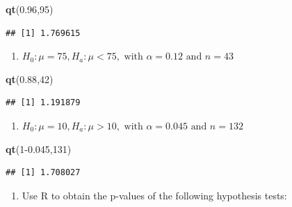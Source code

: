 \documentclass[
  openany]{book}
\newenvironment{Shaded}{\begin{snugshade}}{\end{snugshade}}
\newcommand{\DecValTok}[1]{\textcolor[rgb]{0.00,0.00,0.81}{#1}}
\newcommand{\FloatTok}[1]{\textcolor[rgb]{0.00,0.00,0.81}{#1}}
\newcommand{\FunctionTok}[1]{\textcolor[rgb]{0.13,0.29,0.53}{\textbf{#1}}}
\newcommand{\NormalTok}[1]{#1}
\providecommand{\tightlist}{%
  \setlength{\itemsep}{0pt}\setlength{\parskip}{0pt}}
\begin{document}
\begin{Shaded}
\begin{Highlighting}[]
\FunctionTok{qt}\NormalTok{(}\FloatTok{0.96}\NormalTok{,}\DecValTok{95}\NormalTok{)}
\end{Highlighting}
\end{Shaded}

\begin{verbatim}
## [1] 1.769615
\end{verbatim}

\begin{enumerate}
\def\labelenumi{\alph{enumi}.}
\setcounter{enumi}{1}
\tightlist
\item
  \(H_0: \mu = 75, H_a: \mu < 75, \text{ with } \alpha=0.12 \text{ and } n=43\)
\end{enumerate}

\begin{Shaded}
\begin{Highlighting}[]
\FunctionTok{qt}\NormalTok{(}\FloatTok{0.88}\NormalTok{,}\DecValTok{42}\NormalTok{)}
\end{Highlighting}
\end{Shaded}

\begin{verbatim}
## [1] 1.191879
\end{verbatim}

\begin{enumerate}
\def\labelenumi{\alph{enumi}.}
\setcounter{enumi}{2}
\tightlist
\item
  \(H_0: \mu = 10, H_a: \mu > 10, \text{ with } \alpha=0.045 \text{ and } n=132\)
\end{enumerate}

\begin{Shaded}
\begin{Highlighting}[]
\FunctionTok{qt}\NormalTok{(}\DecValTok{1}\FloatTok{{-}0.045}\NormalTok{,}\DecValTok{131}\NormalTok{)}
\end{Highlighting}
\end{Shaded}

\begin{verbatim}
## [1] 1.708027
\end{verbatim}

\begin{enumerate}
\def\labelenumi{\arabic{enumi}.}
\setcounter{enumi}{14}
\tightlist
\item
  Use R to obtain the p-values of the following hypothesis tests:
\end{enumerate}
\end{document}

